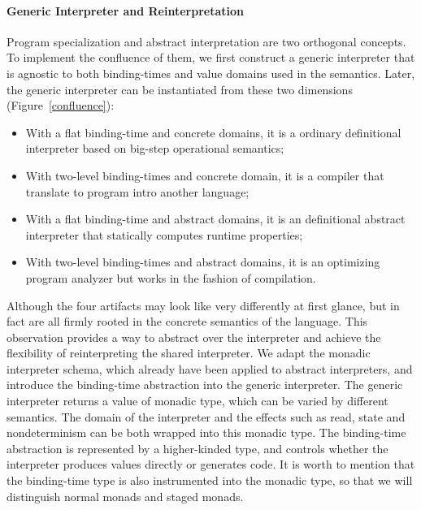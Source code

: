 

\paragraph{Generic Interpreter and Reinterpretation}

Program specialization and abstract interpretation are two orthogonal
concepts.  To implement the confluence of them, we first construct a
generic interpreter that is agnostic to both binding-times and value
domains used in the semantics.  Later, the generic interpreter can be
instantiated from these two dimensions (Figure~\ref{confluence}):
\begin{itemize}
\item With a flat binding-time and concrete domains, it is a ordinary
  definitional interpreter based on big-step operational semantics;
\item With two-level binding-times and concrete domain, it is a
  compiler that translate to program intro another language;
\item With a flat binding-time and abstract domains, it is an
  definitional abstract interpreter \cite{DBLP:journals/pacmpl/DaraisLNH17}
  that statically computes runtime properties;
\item With two-level binding-times and abstract domains, it is an optimizing
  program analyzer but works in the fashion of compilation.
\end{itemize}

Although the four artifacts may look like very differently at first
glance, but in fact are all firmly rooted in the concrete semantics of
the language.  This observation provides a way to abstract over the
interpreter and achieve the flexibility of reinterpreting the shared
interpreter. We adapt the monadic interpreter schema, which already
have been applied to abstract interpreters, and introduce the
binding-time abstraction into the generic interpreter.  The generic
interpreter returns a value of monadic type, which can be varied by
different semantics. The domain of the interpreter and the effects
such as read, state and nondeterminism can be both wrapped into this
monadic type.  The binding-time abstraction is represented by a
higher-kinded type, and controls whether the interpreter produces
values directly or generates code.  It is worth to mention that the
binding-time type is also instrumented into the monadic type, so that
we will distinguish normal monads and staged monads.

